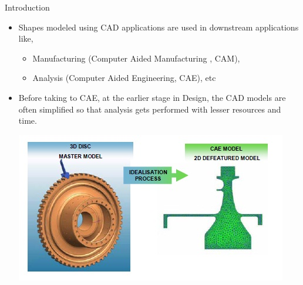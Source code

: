 
\begin{frame}{Introduction}
\begin{itemize}[noitemsep,label=\textbullet,topsep=2pt,parsep=2pt,partopsep=2pt]
\item Shapes modeled using CAD applications are used in downstream applications like,
\begin{itemize}[noitemsep,label=\textbullet,topsep=2pt,parsep=2pt,partopsep=2pt]
\item Manufacturing (Computer Aided Manufacturing , CAM),
\item Analysis (Computer Aided Engineering, CAE), etc
\end{itemize}
\item Before taking to CAE, at the earlier stage in Design, the CAD models are often simplified so that analysis gets performed with lesser resources and time.

\vspace{.5cm}
\includegraphics[width=0.65\linewidth]{../Common/images/idealization.jpg}
\end{itemize}


\end{frame}




